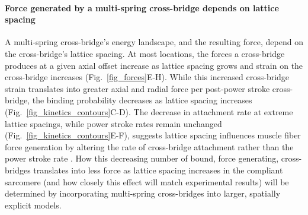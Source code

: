 \documentclass[10pt]{article}
\newcommand{\citep}[1]{\cite{#1}} %
\begin{document}
\paragraph{Force generated by a multi-spring cross-bridge depends on lattice spacing} %
A multi-spring cross-bridge's energy landscape, and the resulting force, depend on the cross-bridge's lattice spacing.
At most locations, the forces a cross-bridge produces at a given axial offset increase as lattice spacing grows and strain on the cross-bridge increases (Fig.~\ref{fig_forces}E-H). 
While this increased cross-bridge strain translates into greater axial and radial force per post-power stroke cross-bridge, the binding probability decreases as lattice spacing increases (Fig.~\ref{fig_kinetics_contours}C-D).
The decrease in attachment rate at extreme lattice spacings, while power stroke rates remain unchanged (Fig.~\ref{fig_kinetics_contours}E-F), suggests lattice spacing influences muscle fiber force generation by altering the rate of cross-bridge attachment rather than the power stroke rate \citep{Martyn2004}. 
How this decreasing number of bound, force generating, cross-bridges translates into less force as lattice spacing increases in the compliant sarcomere (and how closely this effect will match experimental results) will be determined by incorporating multi-spring cross-bridges into larger, spatially explicit models. 
\end{document}
